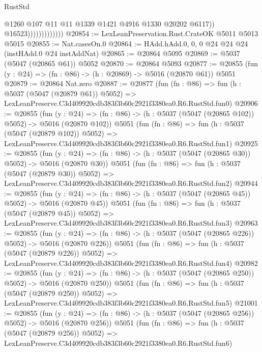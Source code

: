 \begin{lexlean}{RustStd}
\begin{coremodule}
                                  @1260
                                  @107
                                  @11
                                  @11
                                  @1339
                                  @1421
                                  @4916
                                  @1330
                                  @20202
                                  @6117))
                              @16523)))))))))))))
@20854 := LexLeanPreservation.Rust.CrateOK @5011 @5013 @5015
@20855 := Nat.casesOn.{0}
@20864 := HAdd.hAdd.{0, 0, 0} @24 @24 @24 (instHAdd.{0} @24 instAddNat)
@20865 := @20864 @5095
@20869 := @5037 (@5047 (@20865 @61)) @5052
@20870 := @20864 @5093
@20877 := @20855 (fun (y : @24) => (fn : @86) -> (h : @20869) -> @5016 (@20870 @61)) @5051
@20879 := @20864 Nat.zero
@20887 := @20877
    (fun (fn : @86) =>
    fun (h : @5037 (@5047 (@20879 @61)) @5052) =>
    LexLeanPreserve.C3d409920cdb383f3b60c2921f3380ea0.R6.RustStd.fun0)
@20906 := @20855
    (fun (y : @24) => (fn : @86) -> (h : @5037 (@5047 (@20865 @102)) @5052) -> @5016 (@20870 @102))
    @5051
    (fun (fn : @86) =>
    fun (h : @5037 (@5047 (@20879 @102)) @5052) =>
    LexLeanPreserve.C3d409920cdb383f3b60c2921f3380ea0.R6.RustStd.fun1)
@20925 := @20855
    (fun (y : @24) => (fn : @86) -> (h : @5037 (@5047 (@20865 @30)) @5052) -> @5016 (@20870 @30))
    @5051
    (fun (fn : @86) =>
    fun (h : @5037 (@5047 (@20879 @30)) @5052) =>
    LexLeanPreserve.C3d409920cdb383f3b60c2921f3380ea0.R6.RustStd.fun2)
@20944 := @20855
    (fun (y : @24) => (fn : @86) -> (h : @5037 (@5047 (@20865 @45)) @5052) -> @5016 (@20870 @45))
    @5051
    (fun (fn : @86) =>
    fun (h : @5037 (@5047 (@20879 @45)) @5052) =>
    LexLeanPreserve.C3d409920cdb383f3b60c2921f3380ea0.R6.RustStd.fun3)
@20963 := @20855
    (fun (y : @24) => (fn : @86) -> (h : @5037 (@5047 (@20865 @226)) @5052) -> @5016 (@20870 @226))
    @5051
    (fun (fn : @86) =>
    fun (h : @5037 (@5047 (@20879 @226)) @5052) =>
    LexLeanPreserve.C3d409920cdb383f3b60c2921f3380ea0.R6.RustStd.fun4)
@20982 := @20855
    (fun (y : @24) => (fn : @86) -> (h : @5037 (@5047 (@20865 @250)) @5052) -> @5016 (@20870 @250))
    @5051
    (fun (fn : @86) =>
    fun (h : @5037 (@5047 (@20879 @250)) @5052) =>
    LexLeanPreserve.C3d409920cdb383f3b60c2921f3380ea0.R6.RustStd.fun5)
@21001 := @20855
    (fun (y : @24) => (fn : @86) -> (h : @5037 (@5047 (@20865 @256)) @5052) -> @5016 (@20870 @256))
    @5051
    (fun (fn : @86) =>
    fun (h : @5037 (@5047 (@20879 @256)) @5052) =>
    LexLeanPreserve.C3d409920cdb383f3b60c2921f3380ea0.R6.RustStd.fun6)

\end{coremodule}
\end{lexlean}
